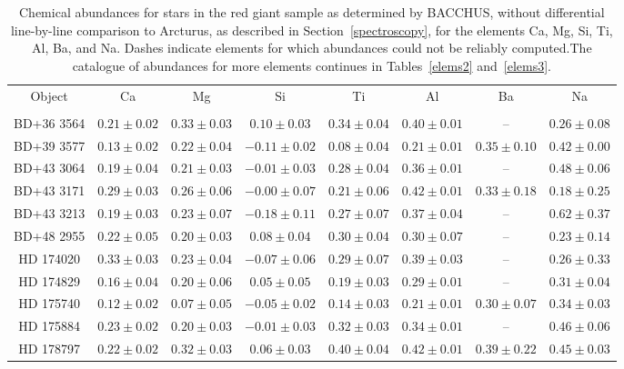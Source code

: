 \begin{table*}
\caption{Chemical abundances for stars in the red giant sample as determined by BACCHUS, without differential line-by-line comparison to Arcturus, as described in Section~\ref{spectroscopy}, for the elements Ca, Mg, Si, Ti, Al, Ba, and Na. Dashes indicate elements for which abundances could not be reliably computed.The catalogue of abundances for more elements continues in Tables~\ref{elems2} and~\ref{elems3}.\label{elems1}}
\begin{tabular}{cccccccc}
\hline \hline
Object & Ca & Mg & Si & Ti & Al & Ba & Na \\
 &  &  &  &  &  &  &  \\
\hline
BD+36 3564 & $0.21 \pm 0.02$ & $0.33 \pm 0.03$ & $0.10 \pm 0.03$ & $0.34 \pm 0.04$ & $0.40 \pm 0.01$ & -- & $0.26 \pm 0.08$ \\
BD+39 3577 & $0.13 \pm 0.02$ & $0.22 \pm 0.04$ & $-0.11 \pm 0.02$ & $0.08 \pm 0.04$ & $0.21 \pm 0.01$ & $0.35 \pm 0.10$ & $0.42 \pm 0.00$ \\
BD+43 3064 & $0.19 \pm 0.04$ & $0.21 \pm 0.03$ & $-0.01 \pm 0.03$ & $0.28 \pm 0.04$ & $0.36 \pm 0.01$ & -- & $0.48 \pm 0.06$ \\
BD+43 3171 & $0.29 \pm 0.03$ & $0.26 \pm 0.06$ & $-0.00 \pm 0.07$ & $0.21 \pm 0.06$ & $0.42 \pm 0.01$ & $0.33 \pm 0.18$ & $0.18 \pm 0.25$ \\
BD+43 3213 & $0.19 \pm 0.03$ & $0.23 \pm 0.07$ & $-0.18 \pm 0.11$ & $0.27 \pm 0.07$ & $0.37 \pm 0.04$ & -- & $0.62 \pm 0.37$ \\
BD+48 2955 & $0.22 \pm 0.05$ & $0.20 \pm 0.03$ & $0.08 \pm 0.04$ & $0.30 \pm 0.04$ & $0.30 \pm 0.07$ & -- & $0.23 \pm 0.14$ \\
HD 174020 & $0.33 \pm 0.03$ & $0.23 \pm 0.04$ & $-0.07 \pm 0.06$ & $0.29 \pm 0.07$ & $0.39 \pm 0.03$ & -- & $0.26 \pm 0.33$ \\
HD 174829 & $0.16 \pm 0.04$ & $0.20 \pm 0.06$ & $0.05 \pm 0.05$ & $0.19 \pm 0.03$ & $0.29 \pm 0.01$ & -- & $0.31 \pm 0.04$ \\
HD 175740 & $0.12 \pm 0.02$ & $0.07 \pm 0.05$ & $-0.05 \pm 0.02$ & $0.14 \pm 0.03$ & $0.21 \pm 0.01$ & $0.30 \pm 0.07$ & $0.34 \pm 0.03$ \\
HD 175884 & $0.23 \pm 0.02$ & $0.20 \pm 0.03$ & $-0.01 \pm 0.03$ & $0.32 \pm 0.03$ & $0.34 \pm 0.01$ & -- & $0.46 \pm 0.06$ \\
HD 178797 & $0.22 \pm 0.02$ & $0.32 \pm 0.03$ & $0.06 \pm 0.03$ & $0.40 \pm 0.04$ & $0.42 \pm 0.01$ & $0.39 \pm 0.22$ & $0.45 \pm 0.03$ \\

\end{tabular}
\end{table*}
